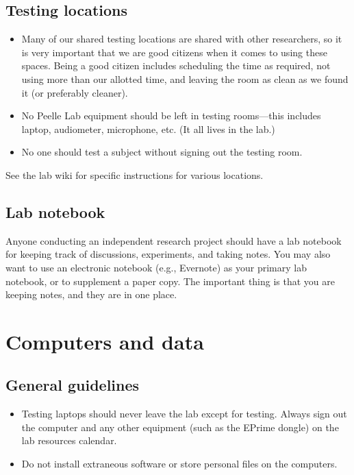 \documentclass[letterpaper,12pt,oneside]{memoir}
\begin{document}
\subsection{Testing locations}
\label{sec:testing_locations}

\begin{itemize}
\item Many of our shared testing locations are shared with other researchers, so it is very important that we are good citizens when it comes to using these spaces. Being a good citizen includes scheduling the time as required, not using more than our allotted time, and leaving the room as clean as we found it (or preferably cleaner).

\item No Peelle Lab equipment should be left in testing rooms---this includes laptop, audiometer, microphone, etc. (It all lives in the lab.)

\item No one should test a subject without signing out the testing room.
\end{itemize}

 See the lab wiki for specific instructions for various locations.



\subsection{Lab notebook}
\label{sec:lab_notebook}

Anyone conducting an independent research project should have a lab notebook for keeping track of discussions, experiments, and taking notes. You may also want to use an electronic notebook (e.g., Evernote) as your primary lab notebook, or to supplement a paper copy. The important thing is that you are keeping notes, and they are in one place.

\section{Computers and data}

\subsection{General guidelines}

\begin{itemize}
\item Testing laptops should never leave the lab except for testing. Always sign out the computer and any other equipment (such as the EPrime dongle) on the lab resources calendar.
\item Do not install extraneous software or store personal files on the computers.
\end{itemize}
\end{document}
